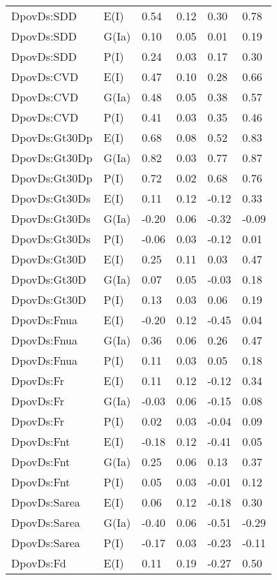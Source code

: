 \begin{center}
\begin{longtable}{|p{1.1in}|p{0.7in}|p{0.7in}|p{0.6in}|p{0.6in}|p{0.6in}|}
  DpovDs:SDD & E(I) & 0.54 & 0.12 & 0.30 & 0.78 \\ 
  DpovDs:SDD & G(Ia) & 0.10 & 0.05 & 0.01 & 0.19 \\ 
  DpovDs:SDD & P(I) & 0.24 & 0.03 & 0.17 & 0.30 \\ 
  DpovDs:CVD & E(I) & 0.47 & 0.10 & 0.28 & 0.66 \\ 
  DpovDs:CVD & G(Ia) & 0.48 & 0.05 & 0.38 & 0.57 \\ 
  DpovDs:CVD & P(I) & 0.41 & 0.03 & 0.35 & 0.46 \\ 
  DpovDs:Gt30Dp & E(I) & 0.68 & 0.08 & 0.52 & 0.83 \\ 
  DpovDs:Gt30Dp & G(Ia) & 0.82 & 0.03 & 0.77 & 0.87 \\ 
  DpovDs:Gt30Dp & P(I) & 0.72 & 0.02 & 0.68 & 0.76 \\ 
  DpovDs:Gt30Ds & E(I) & 0.11 & 0.12 & -0.12 & 0.33 \\ 
  DpovDs:Gt30Ds & G(Ia) & -0.20 & 0.06 & -0.32 & -0.09 \\ 
  DpovDs:Gt30Ds & P(I) & -0.06 & 0.03 & -0.12 & 0.01 \\ 
  DpovDs:Gt30D & E(I) & 0.25 & 0.11 & 0.03 & 0.47 \\ 
  DpovDs:Gt30D & G(Ia) & 0.07 & 0.05 & -0.03 & 0.18 \\ 
  DpovDs:Gt30D & P(I) & 0.13 & 0.03 & 0.06 & 0.19 \\ 
  DpovDs:Fnua & E(I) & -0.20 & 0.12 & -0.45 & 0.04 \\ 
  DpovDs:Fnua & G(Ia) & 0.36 & 0.06 & 0.26 & 0.47 \\ 
  DpovDs:Fnua & P(I) & 0.11 & 0.03 & 0.05 & 0.18 \\ 
  DpovDs:Fr & E(I) & 0.11 & 0.12 & -0.12 & 0.34 \\ 
  DpovDs:Fr & G(Ia) & -0.03 & 0.06 & -0.15 & 0.08 \\ 
  DpovDs:Fr & P(I) & 0.02 & 0.03 & -0.04 & 0.09 \\ 
  DpovDs:Fnt & E(I) & -0.18 & 0.12 & -0.41 & 0.05 \\ 
  DpovDs:Fnt & G(Ia) & 0.25 & 0.06 & 0.13 & 0.37 \\ 
  DpovDs:Fnt & P(I) & 0.05 & 0.03 & -0.01 & 0.12 \\ 
  DpovDs:Sarea & E(I) & 0.06 & 0.12 & -0.18 & 0.30 \\ 
  DpovDs:Sarea & G(Ia) & -0.40 & 0.06 & -0.51 & -0.29 \\ 
  DpovDs:Sarea & P(I) & -0.17 & 0.03 & -0.23 & -0.11 \\ 
  DpovDs:Fd & E(I) & 0.11 & 0.19 & -0.27 & 0.50 \\ 

\end{longtable}
\end{center}
